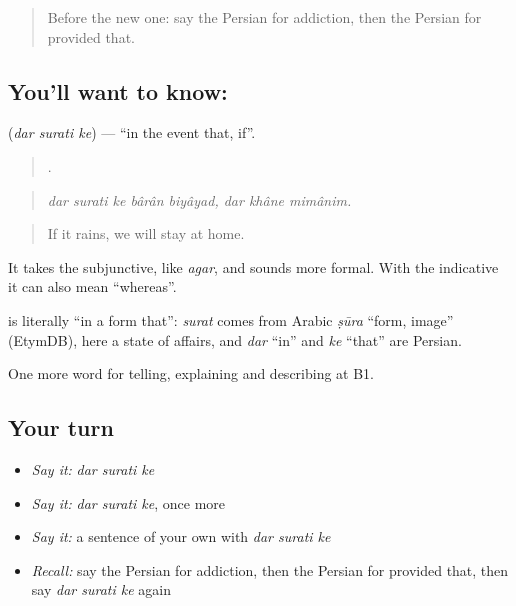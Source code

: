 \label{lesson:FA-C390-dar-surati-ke}



\begin{quote}
Before the new one: say the Persian for addiction, then the Persian for provided that.
\end{quote}

\subsection*{You'll want to know:   }
\textbf{  } (\emph{dar surati ke}) — \textquotedblleft{}in the event that, if\textquotedblright{}.

\begin{quote}
       .
\end{quote}

\begin{quote}
\emph{dar surati ke bârân biyâyad, dar khâne mimânim.}
\end{quote}

\begin{quote}
If it rains, we will stay at home.
\end{quote}

It takes the subjunctive, like \emph{agar}, and sounds more formal. With the indicative it can also mean \textquotedblleft{}whereas\textquotedblright{}.

\begin{cousinweb}
\textbf{  } is literally \textquotedblleft{}in a form that\textquotedblright{}: \emph{surat} comes from Arabic \emph{ṣūra} \textquotedblleft{}form, image\textquotedblright{} (EtymDB), here a state of affairs, and \emph{dar} \textquotedblleft{}in\textquotedblright{} and \emph{ke} \textquotedblleft{}that\textquotedblright{} are Persian.
\end{cousinweb}

\begin{grammarlens}[title={What you've built}]
One more word for telling, explaining and describing at B1.
\end{grammarlens}

\subsection*{Your turn}
\begin{itemize}
\raggedright
  \item \emph{Say it:} \emph{dar surati ke}
  \item \emph{Say it:} \emph{dar surati ke}, once more
  \item \emph{Say it:} a sentence of your own with \emph{dar surati ke}
  \item \emph{Recall:} say the Persian for addiction, then the Persian for provided that, then say \emph{dar surati ke} again
\end{itemize}

